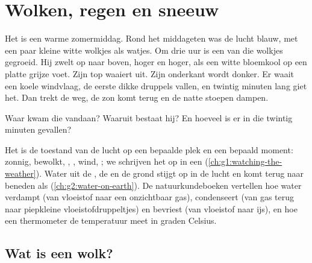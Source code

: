 \chapter{Wolken, regen en sneeuw}\label{ch:g4:clouds-rain-snow}

Het is een warme zomermiddag. Rond het middageten was de lucht blauw, met
een paar kleine witte wolkjes als watjes. Om drie uur is een van die
wolkjes gegroeid. Hij zwelt op naar boven, hoger en hoger, als een witte
bloemkool op een platte grijze voet. Zijn top waaiert uit. Zijn onderkant
wordt donker. Er waait een koele windvlaag, de eerste dikke druppels vallen,
en twintig minuten lang giet het. Dan trekt de  weg, de zon komt terug
en de natte stoepen dampen.

Waar kwam die  vandaan? Waaruit bestaat hij? En hoeveel  is er in
die twintig minuten gevallen?

\begin{recall}
Het  is de toestand van de lucht op een bepaalde plek en een bepaald
moment: zonnig, bewolkt, , , wind, ; we schrijven het op in
een  (\cref{ch:g1:watching-the-weather}). Water uit de , de
 en de grond stijgt op in de lucht en komt terug naar beneden als 
(\cref{ch:g2:water-on-earth}). De natuurkundeboeken vertellen hoe water
verdampt (van vloeistof naar een onzichtbaar gas), condenseert (van gas
terug naar piepkleine vloeistofdruppeltjes) en bevriest (van vloeistof naar
ijs), en hoe een thermometer de temperatuur meet in graden Celsius.
\end{recall}

\section{Wat is een wolk?}

